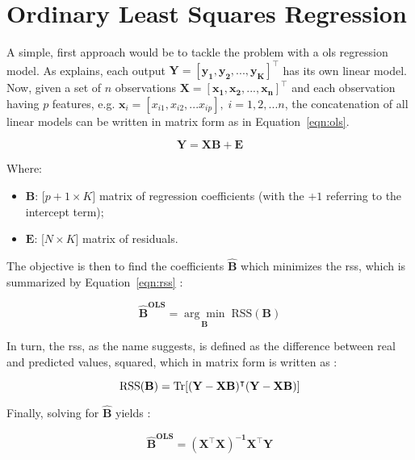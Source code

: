 \section{Ordinary Least Squares Regression}
\label{sec:linreg}

A simple, first approach would be to tackle the problem with a \acrfull{ols} regression model. As \cite{friedman2001} explains, each output  $\mathbf{Y = [y_1, y_2, ... , y_K]^\intercal} $ has its own linear model. Now, given a set of $n$ observations $\mathbf{X = [x_1, x_2, ..., x_n]^\intercal}$ and each observation having $p$ features, e.g. $\mathbf{x}_i = [x_{i1}, x_{i2}, ... x_{ip}], \; i = 1,2,...n$, the concatenation of all linear models can be written in matrix form as in Equation~\ref{eqn:ols}.

\begin{equation}
	\label{eqn:ols}
	\mathbf{Y = XB +  E}
\end{equation}

Where:
\begin{itemize}
	\item $\mathbf{B}$: [$p+1 \times K]$ matrix of regression coefficients (with the $+1$ referring to the intercept term);
	\item $\mathbf{E}$: [$N \times K]$ matrix of residuals.
\end{itemize}

The objective is then to find the coefficients $\mathbf{\hat{B}}$ which minimizes the \acrfull{rss}, which is summarized by Equation~\ref{eqn:rss} \parencite{friedman2001}:

\begin{equation}
	\label{eqn:betahat}
	\mathbf{\hat{B}^\text{OLS}} = \underset{\mathbf{B}}{\arg\min} 	\; \text{RSS}(\mathbf{B})
\end{equation}

In turn, the \acrshort{rss}, as the name suggests, is defined as the difference between real and predicted values, squared, which in matrix form is written as \parencite{friedman2001}:

\begin{equation} 
	\label{eqn:rss}
	\text{RSS}(\mathbf{B}) = \operatorname{Tr} [\mathbf{(Y-XB)^\intercal (Y-XB)}]
\end{equation}

Finally, solving for $\mathbf{\hat{B}}$ yields \parencite{friedman2001}:

\begin{equation}
	\label{eqn:ols_beta}
	\mathbf{\hat{B}^\text{OLS}} = \mathbf{(X^\intercal X)^{-1} X^\intercal Y}
\end{equation}

